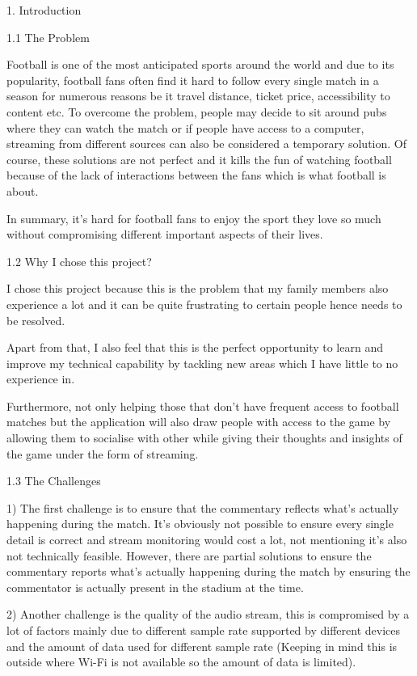 \documentclass{article}
\begin{document}
\begin{flushleft}
{\huge 1. Introduction} \par
{\Large1.1 The Problem} \par
Football is one of the most anticipated sports around the world and due to its popularity, football fans often find it hard to follow every single match in a season for numerous reasons be it travel distance, ticket price, accessibility to content etc. To overcome the problem, people may decide to sit around pubs where they can watch the match or if people have access to a computer, streaming from different sources can also be considered a temporary solution. Of course, these solutions are not perfect and it kills the fun of watching football because of the lack of interactions between the fans which is what football is about.\par
In summary, it's hard for football fans to enjoy the sport they love so much without compromising different important aspects of their lives.\par
{\Large 1.2 Why I chose this project?} \par
I chose this project because this is the problem that my family members also experience a lot and it can be quite frustrating to certain people hence needs to be resolved.\par
Apart from that, I also feel that this is the perfect opportunity to learn and improve my technical capability by tackling new areas which I have little to no experience in.\par
Furthermore, not only helping those that don't have frequent access to football matches but the application will also draw people with access to the game by allowing them to socialise with other while giving their thoughts and insights of the game under the form of streaming.\par
{\Large 1.3 The Challenges} \par
1) The first challenge is to ensure that the commentary reflects what's actually happening during the match. It's obviously not possible to ensure every single detail is correct and stream monitoring would cost a lot, not mentioning it's also not technically feasible. However, there are partial solutions to ensure the commentary reports what's actually happening during the match by ensuring the commentator is actually present in the stadium at the time.\par
2) Another challenge is the quality of the audio stream, this is compromised by a lot of factors mainly due to different sample rate supported by different devices and the amount of data used for different sample rate (Keeping in mind this is outside where Wi-Fi is not available so the amount of data is limited).\par

\end{flushleft}
\end{document}
